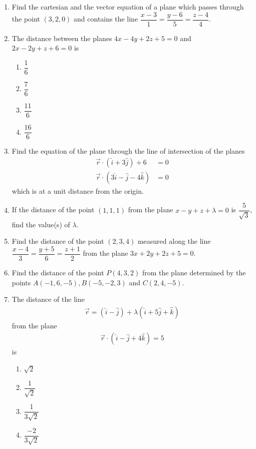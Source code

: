 \begin{enumerate}[label=\thesection.\arabic*.,ref=\thesection.\theenumi]
	\item Find the cartesian and the vector equation of a plane which passes through the point $(3,2,0)$ and contains the line $\dfrac{x-3}{1}=\dfrac{y-6}{5}=\dfrac{z-4}{4}$.

	\item The distance between the planes $4x-4y+2z+5=0$ and $2x-2y+z+6=0$ is

		\begin{enumerate}

			\item $\dfrac{1}{6}$
			\item $\dfrac{7}{6}$
			\item $\dfrac{11}{6}$
			\item $\dfrac{16}{6}$
		\end{enumerate}

	\item Find the equation of the plane through the line of intersection of the planes
		\begin{align}
			\vec{r}\cdot(\hat{i}+3\hat{j})+6&=0\\\vec{r}\cdot(3\hat{i}-\hat{j}-4\hat{k})&=0
		\end{align}which is at a  unit distance from the origin.

		\item If the distance of the point $(1,1,1)$ from the plane $x-y+z+\lambda=0$ is $\dfrac{5}{\sqrt{3}}$, find the value(s) of $\lambda$.

	\item Find the distance of the point $(2,3,4)$ measured along the line $\dfrac{x-4}{3}=\dfrac{y+5}{6}=\dfrac{z+1}{2}$ from the plane $3x+2y+2z+5=0$.

	\item Find the distance of the point $P(4,3,2)$ from the plane determined by the points $A(-1,6,-5),B(-5,-2,3)$ and $C(2,4,-5)$.

	\item The distance of the line
		\begin{align}
		\vec{r}=(\hat{i}-\hat{j})+\lambda(\hat{i}+5\hat{j}+\hat{k})\end{align}
		from the plane
		\begin{align}
		\vec{r}\cdot(\hat{i}-\hat{j}+4\hat{k})=5\end{align}
		is
		\begin{enumerate}
			\item $\sqrt{2}$
			\item $\dfrac{1}{\sqrt{2}}$
			\item $\dfrac{1}{3\sqrt{2}}$
			\item $\dfrac{-2}{3\sqrt{2}}$
		\end{enumerate}


\end{enumerate}
